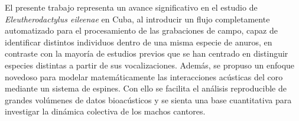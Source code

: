 El presente trabajo representa un avance significativo en el 
estudio de \emph{Eleutherodactylus eileenae} en Cuba, al 
introducir un flujo completamente automatizado para el 
procesamiento de las grabaciones de campo,
capaz de identificar distintos individuos dentro de una misma 
especie de anuros, en contraste con la mayoría de estudios 
previos que se han centrado en distinguir especies distintas a 
partir de sus vocalizaciones.
Además, se propuso un enfoque novedoso para modelar 
matemáticamente las interacciones acústicas del coro mediante un 
sistema de espines. Con ello se facilita el análisis 
reproducible de grandes volúmenes de datos bioacústicos y se 
sienta una base cuantitativa para investigar la dinámica 
colectiva de los machos cantores.